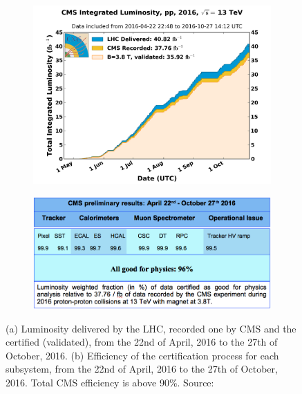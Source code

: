 \begin{figure}[htbp]
    \centering
    \begin{subfigure}[b]{0.6\textwidth}
        \centering
        \includegraphics[width=\textwidth]{figures_and_tables/rpc/lumi_plot.png}  
        \caption{}
    \end{subfigure}
    \hfill
    \begin{subfigure}[b]{0.35\textwidth}
        \centering
        \includegraphics[width=\textwidth]{figures_and_tables/rpc/lumi_table.png}  
        \caption{}
    \end{subfigure}
    \caption{(a) Luminosity delivered by the LHC, recorded one by CMS and the certified (validated), from the 22nd of April, 2016 to the 27th of October, 2016. (b) Efficiency of the certification process for each subsystem, from the 22nd of April, 2016 to the 27th of October, 2016. Total CMS efficiency is above 90\%. Source:~\cite{certification}}%
    \label{lumi}%
\end{figure}

